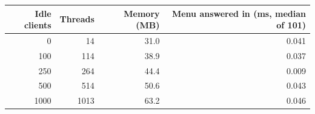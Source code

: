 \begin{tabular}{rrrr}
\toprule
Idle clients & Threads & Memory (MB) & Menu answered in (ms, median of 101) \\
\midrule
0 & 14 & 31.0 & 0.041 \\
100 & 114 & 38.9 & 0.037 \\
250 & 264 & 44.4 & 0.009 \\
500 & 514 & 50.6 & 0.043 \\
1000 & 1013 & 63.2 & 0.046 \\
\bottomrule
\end{tabular}
